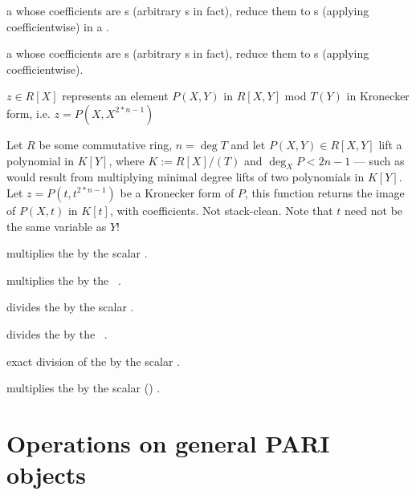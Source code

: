   a  whose
coefficients are s (arbitrary s in fact), reduce them to
s (applying  coefficientwise) in a .

  a  whose
coefficients are s (arbitrary s in fact), reduce them to
s (applying  coefficientwise).


 $z\in R[X]$ represents an element
$P(X,Y)$ in $R[X,Y]$ mod $T(Y)$ in Kronecker form, i.e. $z = P(X,X^{2*n-1})$

Let $R$ be some commutative ring, $n = \deg T$ and let $P(X,Y)\in R[X,Y]$ lift
a polynomial in $K[Y]$, where $K := R[X]/(T)$ and $\deg_X P < 2n-1$ --- such as
would result from multiplying minimal degree lifts of two polynomials in
$K[Y]$. Let $z = P(t,t^{2*n-1})$ be a Kronecker form of $P$, this function
returns the image of $P(X,t)$ in $K[t]$, with  coefficients.
Not stack-clean. Note that $t$ need not be the same variable as $Y$!

 multiplies the  
by the scalar .

 multiplies the  
by the ~.

 divides the  
by the scalar .

 divides the  
by the ~.

 exact division of the 
 by the scalar .

 multiplies the 
 by the scalar () .





\newpage
\chapter{Operations on general PARI objects}

